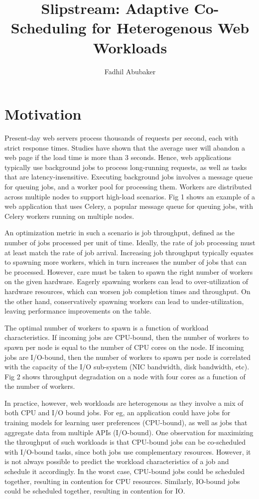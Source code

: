 \documentclass{article}
\title{Slipstream: Adaptive Co-Scheduling for Heterogenous Web Workloads}
\author{Fadhil Abubaker}
\date{}
\begin{document}
\maketitle

\section{Motivation}

Present-day web servers process thousands of requests per second, each with
strict response times. Studies have shown that the average user will abandon a
web page if the load time is more than 3 seconds. Hence, web applications
typically use background jobs to process long-running requests, as well as tasks
that are latency-insensitive. Executing background jobs involves a message
queue for queuing jobs, and a worker pool for processing them. Workers are
distributed across multiple nodes to support high-load scenarios. Fig 1 shows an
example of a web application that uses Celery, a popular message queue for
queuing jobs, with Celery workers running on multiple nodes.

An optimization metric in such a scenario is job throughput, defined as the
number of jobs processed per unit of time. Ideally, the rate of job processing
must at least match the rate of job arrival. Increasing job throughput typically
equates to spawning more workers, which in turn increases the number of jobs
that can be processed. However, care must be taken to spawn the right number of
workers on the given hardware. Eagerly spawning workers can lead to
over-utilization of hardware resources, which can worsen job completion times
and throughput. On the other hand, conservatively spawning workers can lead to
under-utilization, leaving performance improvements on the table.

The optimal number of workers to spawn is a function of workload
characteristics. If incoming jobs are CPU-bound, then the number of workers to
spawn per node is equal to the number of CPU cores on the node. If incoming jobs
are I/O-bound, then the number of workers to spawn per node is correlated with
the capacity of the I/O sub-system (NIC bandwidth, disk bandwidth, etc). Fig 2
shows throughput degradation on a node with four cores as a function of the
number of workers.

In practice, however, web workloads are heterogenous as they involve a mix of
both CPU and I/O bound jobs. For eg, an application could have jobs for training
models for learning user preferences (CPU-bound), as well as jobs that aggregate
data from multiple APIs (I/O-bound). One observation for maximizing the
throughput of such workloads is that CPU-bound jobs can be co-scheduled with
I/O-bound tasks, since both jobs use complementary resources. However, it is not
always possible to predict the workload characteristics of a job and schedule it
accordingly. In the worst case, CPU-bound jobs could be scheduled together,
resulting in contention for CPU resources. Similarly, IO-bound jobs could be
scheduled together, resulting in contention for IO.
\end{document}
